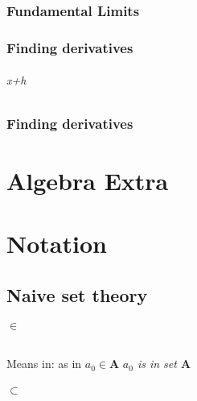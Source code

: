 \documentclass[12pt, a4paper,oneside]{book}
\begin{document}
    \section{Fundamental Limits}
        

\section{Finding derivatives}
\paragraph{x+h}

\section{Finding derivatives}


\part {Algebra Extra}

\appendix 
\part{Notation}
\chapter{Naive set theory}
\paragraph{\(\in\)}
\begin{paragraph}
Means in: as in \(a_0 \in \mathbf{A}\) \textit{\(a_0\) is in set \(\mathbf{A}\)} 
\end{paragraph}
\paragraph {\(\subset\)}
\end{document}

